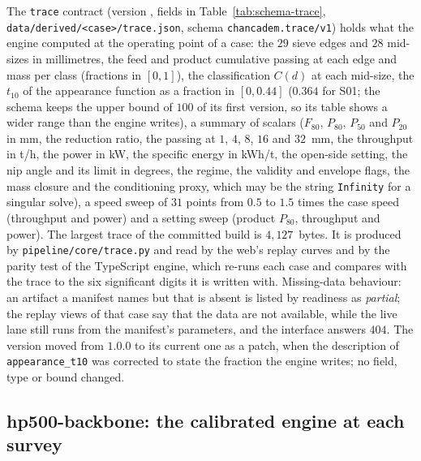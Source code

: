 The \texttt{trace} contract (version , fields in Table~\ref{tab:schema-trace}, \texttt{data/\allowbreak{}derived/\allowbreak{}<case>/\allowbreak{}trace.json}, schema \texttt{chancadem.trace/\allowbreak{}v1}) holds
what the engine computed at the operating point of a case: the $29$ sieve edges and $28$ mid-sizes in millimetres, the feed
and product cumulative passing at each edge and mass per class (fractions in $[0,1]$), the classification $C(d)$ at each
mid-size, the $t_{10}$ of the appearance function as a fraction in $[0, 0.44]$ ($0.364$ for S01; the schema keeps the upper bound
of $100$ of its first version, so its table shows a wider range than the engine writes), a summary of scalars ($F_{80}$, $P_{80}$, $P_{50}$
and $P_{20}$ in mm, the reduction ratio, the passing at $1$, $4$, $8$, $16$ and $32$~mm, the throughput in t/h, the power in kW,
the specific energy in kWh/t, the open-side setting, the nip angle and its limit in degrees, the regime, the validity and
envelope flags, the mass closure and the conditioning proxy, which may be the string \texttt{Infinity} for a singular solve),
a speed sweep of $31$ points from $0.5$ to $1.5$ times the case speed (throughput and power) and a setting sweep (product
$P_{80}$, throughput and power). The largest trace of the committed build is $4{,}127$~bytes. It is produced by
\texttt{pipeline/\allowbreak{}core/\allowbreak{}trace.py} and read by the web's replay curves and by the parity test of the TypeScript engine, which
re-runs each case and compares with the trace to the six significant digits it is written with. Missing-data behaviour: an
artifact a manifest names but that is absent is listed by readiness as \emph{partial}; the replay views of that case say that
the data are not available, while the live lane still runs from the manifest's parameters, and the interface answers $404$. The
version moved from $1.0.0$ to its current one as a patch, when the description of \texttt{appearance\_t10} was corrected to state the
fraction the engine writes; no field, type or bound changed.

\subsection{hp500-backbone: the calibrated engine at each survey}\label{sec:data-backbone}

